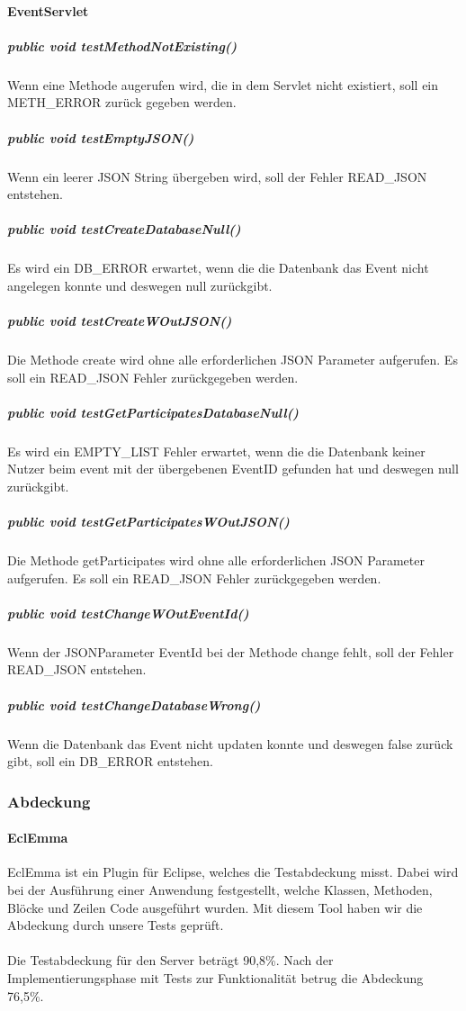 \documentclass{scrartcl}
\begin{document}
\paragraph{EventServlet}
\subparagraph{public void testMethodNotExisting()}
Wenn eine Methode augerufen wird, die in dem Servlet nicht existiert, soll ein METH\_ERROR zurück gegeben werden.
\subparagraph{public void testEmptyJSON()}
Wenn ein leerer JSON String übergeben wird, soll der Fehler READ\_JSON entstehen.
\subparagraph{public void testCreateDatabaseNull()}
Es wird ein DB\_ERROR erwartet, wenn die die Datenbank das Event nicht angelegen konnte und deswegen null zurückgibt.
\subparagraph{public void testCreateWOutJSON()}
Die Methode create wird ohne alle erforderlichen JSON Parameter aufgerufen. Es soll ein READ\_JSON Fehler zurückgegeben werden.
\subparagraph{public void testGetParticipatesDatabaseNull()}
Es wird ein EMPTY\_LIST Fehler erwartet, wenn die die Datenbank keiner Nutzer beim event mit der übergebenen EventID gefunden hat und deswegen null zurückgibt.
\subparagraph{public void testGetParticipatesWOutJSON()}
Die Methode getParticipates wird ohne alle erforderlichen JSON Parameter aufgerufen. Es soll ein READ\_JSON Fehler zurückgegeben werden.
\subparagraph{public void testChangeWOutEventId()}
Wenn der JSONParameter EventId bei der Methode change fehlt, soll der Fehler READ\_JSON entstehen.
\subparagraph{public void testChangeDatabaseWrong()}
 Wenn die Datenbank das Event nicht updaten konnte und deswegen false zurück gibt, soll ein DB\_ERROR entstehen.
 
\newpage
\subsubsection{Abdeckung}
\paragraph{EclEmma}
EclEmma ist ein Plugin für Eclipse, welches die Testabdeckung misst. Dabei wird bei der Ausführung einer Anwendung festgestellt, welche Klassen, Methoden, Blöcke und Zeilen Code ausgeführt wurden. 
Mit diesem Tool haben wir die Abdeckung durch unsere Tests geprüft.
\paragraph{}
Die Testabdeckung für den Server beträgt 90,8\%.
Nach der Implementierungsphase mit Tests zur Funktionalität betrug die Abdeckung 76,5\%.
\end{document}

